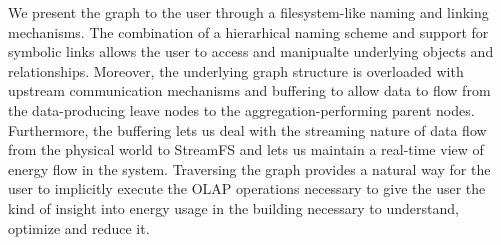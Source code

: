 We present the graph to the user through a filesystem-like naming and linking mechanisms.  The combination of a
hierarhical naming scheme and support for symbolic links allows the user to access and manipualte underlying objects
and relationships.  Moreover, the underlying graph structure is overloaded with upstream communication mechanisms
and buffering to allow data to flow from the data-producing leave nodes to the aggregation-performing
parent nodes.  Furthermore, the buffering lets us deal with the streaming nature of data flow from the physical
world to StreamFS and lets us maintain a real-time view of energy flow in the system.
Traversing the graph provides a natural way for the user to implicitly execute the OLAP operations necessary 
to give the user the kind of insight into energy usage in the building necessary to understand, optimize and 
reduce it.







